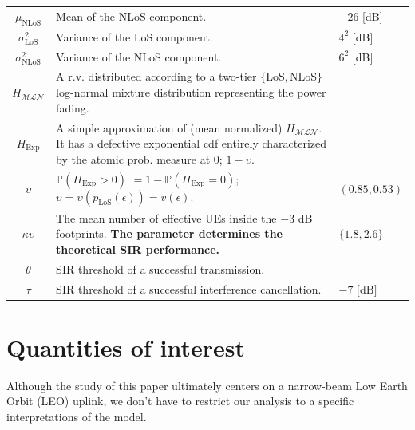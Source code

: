 \documentclass[lettersize,journal]{IEEEtran}
\begin{document}
\begin{table}
\begin{center}
\begin{tabular}{|c|p{4.5cm}|p{1.9cm}|}
      $\mu_{\text{NLoS}}$& Mean of the NLoS component. & $-26$ [dB] \\
      $\sigma^2_{\text{LoS}}$& Variance of the LoS component. & $4^2$ [dB] \\
      $\sigma^2_{\text{NLoS}}$& Variance of the NLoS component. & $6^2$ [dB] \\
      $H_{\mathcal{M}\mathcal{L}\mathcal{N}}$ & A r.v. distributed according to a two-tier $\{\text{LoS}, \text{NLoS}\}$ log-normal mixture distribution representing the power fading.&   \\
      $H_{\text{Exp}}$ & A simple approximation of (mean normalized) $H_{\mathcal{M}\mathcal{L}\mathcal{N}}$. It has a defective exponential cdf entirely characterized by the atomic prob. measure at $0$; $1-\upsilon$.&\\
      $\upsilon$ & $\mathbb{P}(H_{\text{Exp}}>0)$ $=1-\mathbb{P}(H_{\text{Exp}}=0)$; $\upsilon = \upsilon(p_{\text{LoS}}(\epsilon))=v(\epsilon)$. &$(0.85,0.53)$ \\
      $\kappa \upsilon$ & The mean number of effective UEs inside the $-3$ dB footprints. \textbf{The parameter determines the theoretical SIR performance.}&$ \{1.8,2.6\}$ \\
      $\theta$ & SIR threshold of a successful transmission.&\\
      $\tau$ & SIR threshold of a successful interference cancellation.& $-7\text{ [dB]}$\\  
      \hline
    \end{tabular}
  \end{center}
\end{table}   


\section{Quantities of interest}
\label{sec:analysissec}

Although the study of this paper ultimately centers on a narrow-beam Low Earth Orbit (LEO) uplink, we don't have to restrict our analysis to a specific interpretations of the model.
\end{document}
